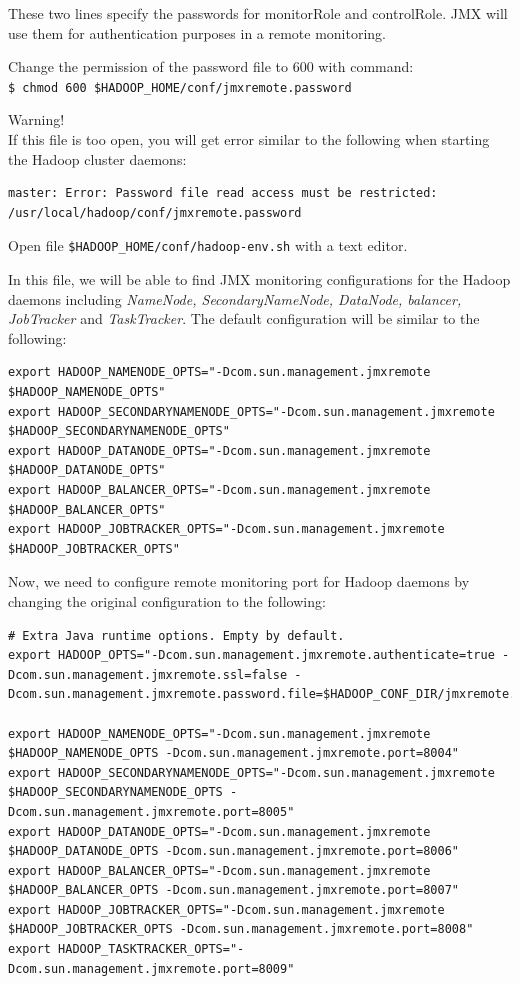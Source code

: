 These two lines specify the passwords for monitorRole and controlRole. JMX will use them for authentication purposes in a remote monitoring.

Change the permission of the password file to 600 with command: \\
\verb|$ chmod 600 $HADOOP_HOME/conf/jmxremote.password|
\begin{warning}
Warning! \\
If this file is too open, you will get error similar to the following when starting the Hadoop cluster daemons:
\lstset{style=bashstyle}
\begin{lstlisting}
master: Error: Password file read access must be restricted: /usr/local/hadoop/conf/jmxremote.password
\end{lstlisting}
\end{warning}

Open file \verb|$HADOOP_HOME/conf/hadoop-env.sh| with a text editor.

In this file, we will be able to find JMX monitoring configurations for the Hadoop daemons including \emph{NameNode, SecondaryNameNode, DataNode, balancer, JobTracker} and \emph{TaskTracker}. The default configuration will be similar to the following:
\lstset{style=bashstyle}
\begin{lstlisting}
export HADOOP_NAMENODE_OPTS="-Dcom.sun.management.jmxremote $HADOOP_NAMENODE_OPTS"
export HADOOP_SECONDARYNAMENODE_OPTS="-Dcom.sun.management.jmxremote $HADOOP_SECONDARYNAMENODE_OPTS"
export HADOOP_DATANODE_OPTS="-Dcom.sun.management.jmxremote $HADOOP_DATANODE_OPTS"
export HADOOP_BALANCER_OPTS="-Dcom.sun.management.jmxremote $HADOOP_BALANCER_OPTS"
export HADOOP_JOBTRACKER_OPTS="-Dcom.sun.management.jmxremote $HADOOP_JOBTRACKER_OPTS"
\end{lstlisting}

Now, we need to configure remote monitoring port for Hadoop daemons by changing the original configuration to the following: 
\lstset{style=bashstyle}
\begin{lstlisting}
# Extra Java runtime options. Empty by default.
export HADOOP_OPTS="-Dcom.sun.management.jmxremote.authenticate=true -Dcom.sun.management.jmxremote.ssl=false -Dcom.sun.management.jmxremote.password.file=$HADOOP_CONF_DIR/jmxremote.password"

export HADOOP_NAMENODE_OPTS="-Dcom.sun.management.jmxremote $HADOOP_NAMENODE_OPTS -Dcom.sun.management.jmxremote.port=8004"
export HADOOP_SECONDARYNAMENODE_OPTS="-Dcom.sun.management.jmxremote $HADOOP_SECONDARYNAMENODE_OPTS -Dcom.sun.management.jmxremote.port=8005"
export HADOOP_DATANODE_OPTS="-Dcom.sun.management.jmxremote $HADOOP_DATANODE_OPTS -Dcom.sun.management.jmxremote.port=8006"
export HADOOP_BALANCER_OPTS="-Dcom.sun.management.jmxremote $HADOOP_BALANCER_OPTS -Dcom.sun.management.jmxremote.port=8007"
export HADOOP_JOBTRACKER_OPTS="-Dcom.sun.management.jmxremote $HADOOP_JOBTRACKER_OPTS -Dcom.sun.management.jmxremote.port=8008"
export HADOOP_TASKTRACKER_OPTS="-Dcom.sun.management.jmxremote.port=8009"
\end{lstlisting}


